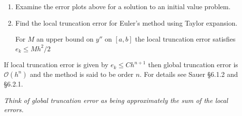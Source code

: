 \documentclass[12pt,letterpaper,noanswers]{exam}
\begin{document}
\begin{enumerate}[resume=classQ]
    \item Examine the error plots above for a solution to an initial value problem.
\item Find the local truncation error for Euler's method using Taylor expansion.
For $M$ an upper bound on $y''$ on $[a,b]$ the local truncation error satisfies $e_k \leq Mh^2/2$
\end{enumerate}
\begin{tcolorbox}
If local truncation error is given by $e_k \leq Ch^{n+1}$ then global truncation error is $\mathcal{O}(h^n)$ and the method is said to be order $n$.  For details see Sauer \S 6.1.2 and \S 6.2.1.

\emph{Think of global truncation error as being approximately the sum of the local errors.}
\end{tcolorbox}
\end{document}
